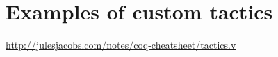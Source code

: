 \section{Examples of custom tactics}


\url{http://julesjacobs.com/notes/coq-cheatsheet/tactics.v}








